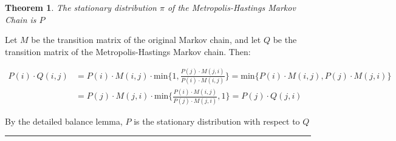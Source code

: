\documentclass[twoside]{article}
\newcounter{lecnum}
\def\beginrefs{\begin{list}%
        {[\arabic{equation}]}{\usecounter{equation}
         \setlength{\leftmargin}{2.0truecm}\setlength{\labelsep}{0.4truecm}%
         \setlength{\labelwidth}{1.6truecm}}}
\def\endrefs{\end{list}}
\def\bibentry#1{\item[\hbox{[#1]}]}
\newtheorem{theorem}{Theorem}[lecnum]
\newenvironment{proof}{{\bf Proof:}}{\hfill\rule{2mm}{2mm}}
\begin{document}
\begin{theorem}
  The stationary distribution $\pi$ of the Metropolis-Hastings Markov Chain is $P$
\end{theorem}

\begin{proof}
Let $M$ be the transition matrix of the original Markov chain, and let $Q$ be the transition matrix of the Metropolis-Hastings Markov chain. Then:

\begin{equation*}
\begin{split}
P(i) \cdot Q(i,j)  & = P(i) \cdot M(i,j) \cdot \mbox{min}\{1, \frac{P(j) \cdot M(j,i)}{P(i) \cdot M(i,j)}\} = \mbox{min}\{P(i) \cdot M(i,j), P(j) \cdot M(j,i) \} \\
& = P(j) \cdot M(j,i) \cdot \mbox{min}\{\frac{P(i) \cdot M(i,j)}{P(j) \cdot M(j,i)}, 1 \} = P(j) \cdot Q(j, i)
\end{split}
\end{equation*}

By the detailed balance lemma, $P$ is the stationary distribution with respect to $Q$
\end{proof}


\end{document}
